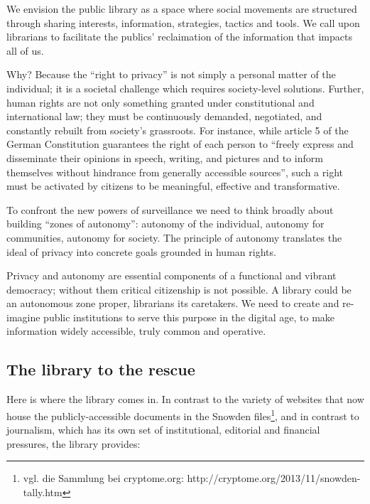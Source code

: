 \documentclass[a4paper,
fontsize=11pt,
oneside,
numbers=noperiodatend,
parskip=half-,
bibliography=totoc,
final
]{scrartcl}
\begin{document}
We envision the public library as a space where social movements are
structured through sharing interests, information, strategies, tactics
and tools. We call upon librarians to facilitate the publics'
reclaimation of the information that impacts all of us.

Why? Because the \enquote{right to privacy} is not simply a personal
matter of the individual; it is a societal challenge which requires
society-level solutions. Further, human rights are not only something
granted under constitutional and international law; they must be
continuously demanded, negotiated, and constantly rebuilt from society's
grassroots. For instance, while article 5 of the German Constitution
guarantees the right of each person to \enquote{freely express and
disseminate their opinions in speech, writing, and pictures and to
inform themselves without hindrance from generally accessible sources},
such a right must be activated by citizens to be meaningful, effective
and transformative.

To confront the new powers of surveillance we need to think broadly
about building \enquote{zones of autonomy}: autonomy of the individual,
autonomy for communities, autonomy for society. The principle of
autonomy translates the ideal of privacy into concrete goals grounded in
human rights.

Privacy and autonomy are essential components of a functional and
vibrant democracy; without them critical citizenship is not possible. A
library could be an autonomous zone proper, librarians its caretakers.
We need to create and re-imagine public institutions to serve this
purpose in the digital age, to make information widely accessible, truly
common and operative.

\subsection*{The library to the rescue}\label{the-library-to-the-rescue}

Here is where the library comes in. In contrast to the variety of
websites that now house the publicly-accessible documents in the Snowden
files\footnote{vgl. die Sammlung bei cryptome.org:
  http://cryptome.org/2013/11/snowden-tally.htm}, and in contrast to
journalism, which has its own set of institutional, editorial and
financial pressures, the library provides:
\end{document}
